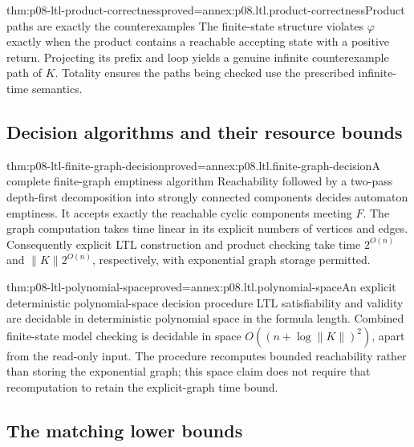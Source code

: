 \begin{hbtheorem}{thm:p08-ltl-product-correctness}{proved=annex:p08.ltl.product-correctness}{Product paths are exactly the counterexamples}
The finite-state structure violates \(\varphi\) exactly when
the product contains a reachable accepting state with a positive
return. Projecting its prefix and loop yields a genuine infinite
counterexample path of \(K\). Totality ensures the paths being
checked use the prescribed infinite-time semantics.
\end{hbtheorem}

\subsection{Decision algorithms and their resource bounds}
\label{sec:p08-ltl-decision-bounds}

\begin{hbtheorem}{thm:p08-ltl-finite-graph-decision}{proved=annex:p08.ltl.finite-graph-decision}{A complete finite-graph emptiness algorithm}
Reachability followed by a two-pass depth-first decomposition
into strongly connected components decides automaton emptiness.
It accepts exactly the reachable cyclic components meeting \(F\).
The graph computation takes time linear in its explicit numbers
of vertices and edges. Consequently explicit LTL construction
and product checking take time \(2^{O(n)}\) and
\(\lVert K\rVert2^{O(n)}\), respectively, with exponential
graph storage permitted.
\end{hbtheorem}

\begin{hbtheorem}{thm:p08-ltl-polynomial-space}{proved=annex:p08.ltl.polynomial-space}{An explicit deterministic polynomial-space decision procedure}
LTL satisfiability and validity are decidable in deterministic
polynomial space in the formula length. Combined finite-state
model checking is decidable in space
\(O((n+\log\lVert K\rVert)^2)\), apart from the read-only
input. The procedure recomputes bounded reachability rather than
storing the exponential graph; this space claim does not require
that recomputation to retain the explicit-graph time bound.
\end{hbtheorem}

\subsection{The matching lower bounds}
\label{sec:p08-ltl-lower-bounds}

